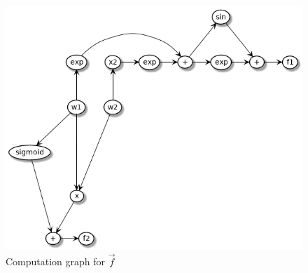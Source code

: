 
\begin{figure}[h!]
    \begin{center}
        \includegraphics[width=0.9\linewidth]{../2_automatocDifferentiation/computation_graph.png}
        \caption{Computation graph for $\vec{f}$}
    \end{center}
\end{figure}
